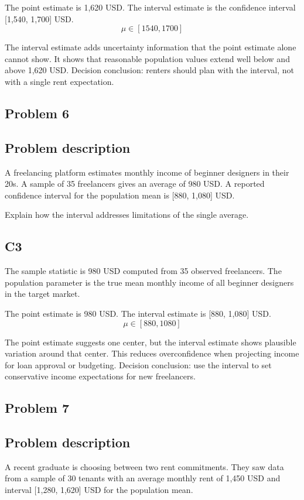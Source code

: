 \begin{ExamProblems}
		The point estimate is 1,620 USD.
		The interval estimate is the confidence interval [1,540, 1,700] USD.
		\[
		\mu \in [1540,1700]
		\]

		The interval estimate adds uncertainty information that the point estimate alone cannot show.
		It shows that reasonable population values extend well below and above 1,620 USD.
		Decision conclusion: renters should plan with the interval, not with a single rent expectation.

		\newpage
		\item
		\subsection*{Problem 6}
		\subsection*{Problem description}
		A freelancing platform estimates monthly income of beginner designers in their 20s.
		A sample of 35 freelancers gives an average of 980 USD.
		A reported confidence interval for the population mean is [880, 1,080] USD.

		Explain how the interval addresses limitations of the single average.

		\subsection*{C3}
		The sample statistic is 980 USD computed from 35 observed freelancers.
		The population parameter is the true mean monthly income of all beginner designers in the target market.

		The point estimate is 980 USD.
		The interval estimate is [880, 1,080] USD.
		\[
		\mu \in [880,1080]
		\]

		The point estimate suggests one center, but the interval estimate shows plausible variation around that center.
		This reduces overconfidence when projecting income for loan approval or budgeting.
		Decision conclusion: use the interval to set conservative income expectations for new freelancers.

		\newpage
		\item
		\subsection*{Problem 7}
		\subsection*{Problem description}
		A recent graduate is choosing between two rent commitments.
		They saw data from a sample of 30 tenants with an average monthly rent of 1,450 USD and interval [1,280, 1,620] USD for the population mean.


\end{ExamProblems}
